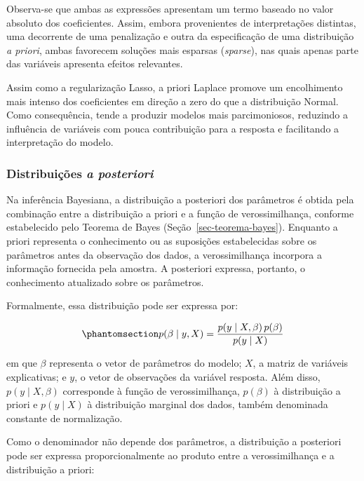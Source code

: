\documentclass[
  brazilian,
  12pt,
  letterpaper,
  DIV=11,
  numbers=noendperiod]{scrartcl}
\begin{document}
Observa-se que ambas as expressões apresentam um termo baseado no valor
absoluto dos coeficientes. Assim, embora provenientes de interpretações
distintas, uma decorrente de uma penalização e outra da especificação de
uma distribuição \emph{a priori}, ambas favorecem soluções mais esparsas
(\emph{sparse}), nas quais apenas parte das variáveis apresenta efeitos
relevantes.

Assim como a regularização Lasso, a priori Laplace promove um
encolhimento mais intenso dos coeficientes em direção a zero do que a
distribuição Normal. Como consequência, tende a produzir modelos mais
parcimoniosos, reduzindo a influência de variáveis com pouca
contribuição para a resposta e facilitando a interpretação do modelo.

\subsubsection{\texorpdfstring{Distribuições \emph{a
posteriori}}{Distribuições a posteriori}}\label{distribuiuxe7uxf5es-a-posteriori}

Na inferência Bayesiana, a distribuição a posteriori dos parâmetros é
obtida pela combinação entre a distribuição a priori e a função de
verossimilhança, conforme estabelecido pelo Teorema de Bayes
(Seção~\ref{sec-teorema-bayes}). Enquanto a priori representa o
conhecimento ou as suposições estabelecidas sobre os parâmetros antes da
observação dos dados, a verossimilhança incorpora a informação fornecida
pela amostra. A posteriori expressa, portanto, o conhecimento atualizado
sobre os parâmetros.

Formalmente, essa distribuição pode ser expressa por:

\begin{equation}\protect\phantomsection\label{eq-posterior}{
p(\beta \mid y, X)
=
\frac{
p(y \mid X, \beta)\,p(\beta)
}{
p(y \mid X)
}
}\end{equation}

em que \(\beta\) representa o vetor de parâmetros do modelo; \(X\), a
matriz de variáveis explicativas; e \(y\), o vetor de observações da
variável resposta. Além disso, \(p(y \mid X, \beta)\) corresponde à
função de verossimilhança, \(p(\beta)\) à distribuição a priori e
\(p(y \mid X)\) à distribuição marginal dos dados, também denominada
constante de normalização.

Como o denominador não depende dos parâmetros, a distribuição a
posteriori pode ser expressa proporcionalmente ao produto entre a
verossimilhança e a distribuição a priori:
\end{document}
